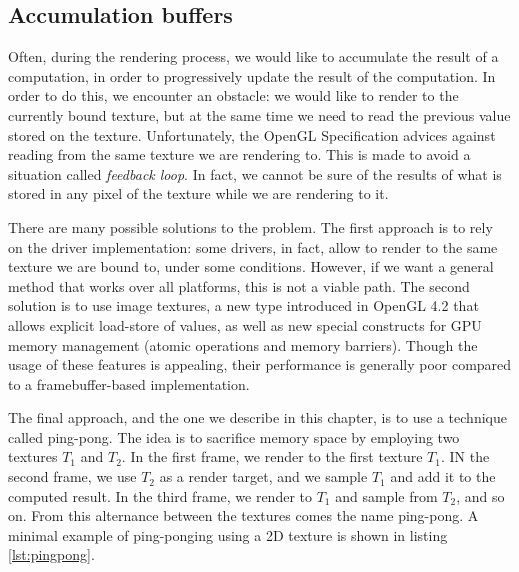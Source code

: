 \subsection{Accumulation buffers}
\label{sec:accumulation}
Often, during the rendering process, we would like to accumulate the result of a computation, in order to progressively update the result of the computation. In order to do this, we encounter an obstacle: we would like to render to the currently bound texture, but at the same time we need to read the previous value stored on the texture. Unfortunately, the OpenGL Specification \citep{openglspec} advices against reading from the same texture we are rendering to. This is made to avoid a situation called \emph{feedback loop}. In fact, we cannot be sure of the results of what is stored in any pixel of the texture while we are rendering to it. 

There are many possible solutions to the problem. The first approach is to rely on the driver implementation: some drivers, in fact, allow to render to the same texture we are bound to, under some conditions. However, if we want a general method that works over all platforms, this is not a viable path. The second solution is to use image textures, a new type introduced in OpenGL 4.2 that allows explicit load-store of values, as well as new special constructs for GPU memory management (atomic operations and memory barriers). Though the usage of these features is appealing, their performance is generally poor compared to a framebuffer-based implementation. 

The final approach, and the one we describe in this chapter, is to use a technique called ping-pong. The idea is to sacrifice memory space by employing two textures $T_1$ and $T_2$. In the first frame, we render to the first texture $T_1$. IN the second frame, we use $T_2$ as a render target, and we sample $T_1$ and add it to the computed result. In the third frame, we render to $T_1$ and sample from $T_2$, and so on. From this alternance between the textures comes the name ping-pong. A minimal example of ping-ponging using a 2D texture is shown in listing \ref{lst:pingpong}.

